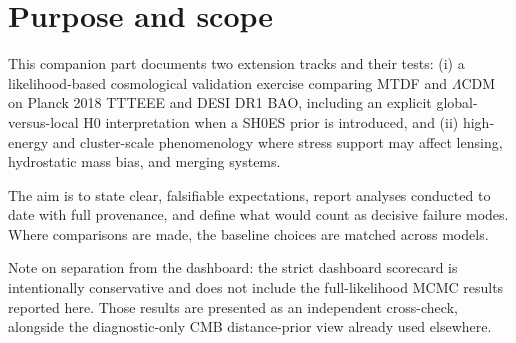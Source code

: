 \documentclass[11pt,a4paper]{article}
\begin{document}
\begin{abstract}
This companion paper (Part IV) documents the cosmological validation of MTDF through a matched CMB+BAO comparison and a full Planck plik TTTEEE + low-$\ell$ + lensing hard-falsifier, alongside high-energy and cluster-scale phenomenology. The full Planck Phase~5 comparison yields a total $\Delta$$\chi$$^{2}$ = +0.63 relative to $\Lambda$CDM (one additional parameter k\textsubscript{f}). Two component-level numbers near +1.25 also appear in this paper, a narrower CMB+BAO summary run and the lensing-likelihood contribution within Phase~5; neither is the full-Planck total. Under the MTDF void-enhancement mapping, the SH0ES tension is reduced from 3.8$\sigma$ to 1.3$\sigma$ without retuning the global fit. We additionally present falsifiable predictions for lensing in merging clusters and stress-support contributions to hydrostatic mass bias.
\end{abstract}

\section{Purpose and scope}
\label{sec:purpose}
This companion part documents two extension tracks and their tests: (i) a likelihood-based cosmological validation exercise comparing MTDF and $\Lambda$CDM on Planck 2018 TTTEEE and DESI DR1 BAO, including an explicit global-versus-local H0 interpretation when a SH0ES prior is introduced, and (ii) high-energy and cluster-scale phenomenology where stress support may affect lensing, hydrostatic mass bias, and merging systems.

The aim is to state clear, falsifiable expectations, report analyses conducted to date with full provenance, and define what would count as decisive failure modes. Where comparisons are made, the baseline choices are matched across models.

\begin{mdframed}[linecolor=accent,linewidth=0.5pt,backgroundcolor=callout-bg,leftline=true,rightline=true,topline=true,bottomline=true,innerleftmargin=8pt,innerrightmargin=8pt,innertopmargin=6pt,innerbottommargin=6pt]
Note on separation from the dashboard: the strict dashboard scorecard is intentionally conservative and does not include the full-likelihood MCMC results reported here. Those results are presented as an independent cross-check, alongside the diagnostic-only CMB distance-prior view already used elsewhere.
\end{mdframed}
\end{document}
